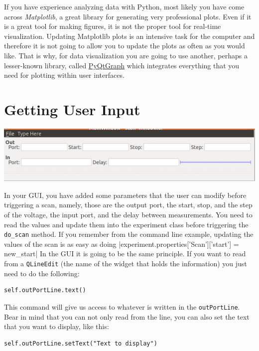 If you have experience analyzing data with Python, most likely you have
come across \emph{Matplotlib}, a great library for generating very
professional plots. Even if it is a great tool for making
figures, it is not the proper tool for real-time visualization. Updating
Matplotlib plots is an intensive task for the computer and therefore it
is not going to allow you to update the plots as often as you would
like. That is why, for data visualization you are going to use another,
perhaps a lesser-known library, called
\href{http://www.pyqtgraph.org/}{PyQtGraph} which integrates everything
that you need for plotting within user interfaces.

\section{Getting User Input}\label{getting-userinput}

\begin{center}
\includegraphics[width=.6\textwidth]{images/scan_window.png}
\end{center}

In your {GUI}, you have added some parameters that the user can modify
before triggering a scan, namely, those are the output port, the start,
stop, and the step of the voltage, the input port, and the delay between
measurements. You need to read the values and update them into the
experiment class before triggering the \texttt{do_scan} method. If you
remember from the command line example, updating the values of the scan
is as easy as doing
|experiment.properties['Scan']['start'] = new_start|
In the {GUI} it is going to be the same principle. If you want to read
from a \texttt{QLineEdit} (the name of the widget that holds the
information) you just need to do the following:

\begin{verbatim}
self.outPortLine.text()
\end{verbatim}

This command will give us access to whatever is written in the
\texttt{outPortLine}. Bear in mind that you can not only read from the
line, you can also set the text that you want to display, like this:

\begin{verbatim}
self.outPortLine.setText("Text to display")
\end{verbatim}

